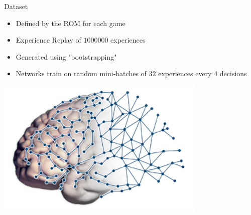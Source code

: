 \documentclass{beamer}
\begin{document}
\begin{frame}{Dataset}
\begin{minipage}{\textwidth}
%
\begin{minipage}{0.6\textwidth}
\begin{itemize}
    \item{Defined by the ROM for each game}
    \item{Experience Replay of $1000000$ experiences}
    \item{Generated using "bootstrapping"}
    \item{Networks train on random mini-batches of $32$ experiences every $4$ decisions}
\end{itemize}
\end{minipage}
%
\hfill
%
\begin{minipage}{0.35\textwidth}
\centering
\includegraphics[width=\textwidth]{img/brain}
\end{minipage}
%
\end{minipage}
\end{frame}
\end{document}
